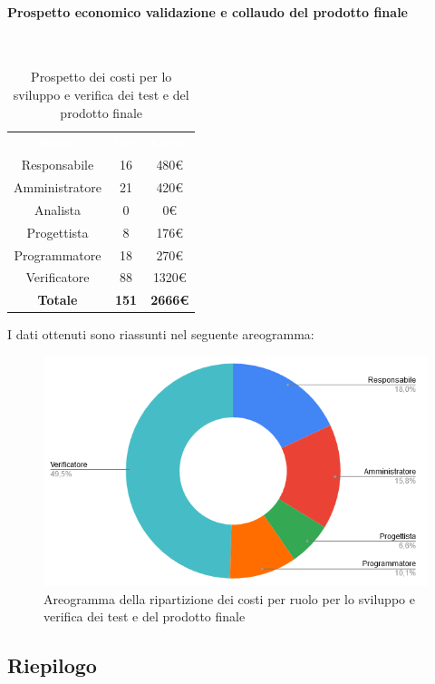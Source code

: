 \paragraph{Prospetto economico validazione e collaudo del prodotto finale}\mbox{} \\
\begin{table}[H]
\centering\renewcommand{\arraystretch}{1.5}
\caption{Prospetto dei costi per lo sviluppo e verifica dei test e del prodotto finale}
\vspace{0.2cm}
\begin{tabular}{ c c c }
\rowcolor{redafk}
\textcolor{white}{\textbf{Ruolo}} & \textcolor{white}{\textbf{Ore}} &
\textcolor{white}{\textbf{Costo}}  \\
Responsabile & 16 & 480€ \\
Amministratore & 21 & 420€ \\
Analista & 0 & 0€ \\
Progettista & 8 & 176€ \\
Programmatore & 18 & 270€  \\
Verificatore & 88 & 1320€  \\
\rowcolor{lastrowcolor}
\textbf{Totale} & \textbf{151} & \textbf{2666€}  \\
\end{tabular}
\end{table}
 
I dati ottenuti sono riassunti nel seguente areogramma:
\begin{figure}[H]
\centering
\includegraphics[scale=0.60]{img/grafici/torta_test.png}
\caption{Areogramma della ripartizione dei costi per ruolo per lo sviluppo e verifica dei test e del prodotto finale}
\end{figure}

\subsection{Riepilogo}
